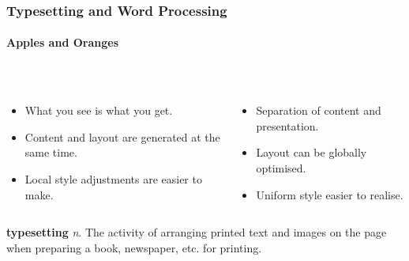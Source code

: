 \begin{frame}
\frametitle{Typesetting and Word Processing}
\framesubtitle{Apples and Oranges}

\begin{columns}[T]
\begin{column}{.5\textwidth}
 \\
\begin{itemize}
\item What you see is what you get.
\item Content and layout are generated at the same time.
\item Local style adjustments are easier to make.
\end{itemize}
\end{column}

\begin{column}{.5\textwidth}
 \\
\begin{itemize}
\item Separation of content and presentation.
\item Layout can be globally optimised.
\item Uniform style easier to realise.
\end{itemize}
\end{column}
\end{columns}

\begin{cvarblock}[0.82\textwidth]{}
\textbf{typesetting} \emph{n}. The activity of arranging printed text and images on the page when preparing a book, newspaper, etc. for printing.
\hfill{}
\end{cvarblock}

\end{frame}


